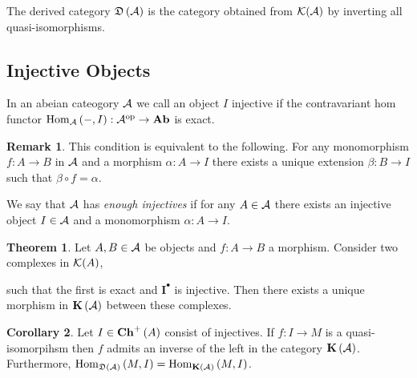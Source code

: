 \documentclass[12pt]{extarticle}
\theoremstyle{definition}
\newtheorem{theorem}{Theorem}[section]
\newtheorem{corollary}[theorem]{Corollary}
\newtheorem{remark}{Remark}
\newenvironment{definition}[1][Definition:]{\begin{trivlist}
\item[\hskip \labelsep {\bfseries #1}]}{\end{trivlist}}
\renewcommand{\bf}[1]{\mathbf{#1}}
\begin{document}
\begin{definition}
The derived category $\mathfrak{D}\left( \mathcal{A} \right)$ is the category obtained from $\mathcal{K}(\mathcal{A})$ by inverting all quasi-isomorphisms. 
\end{definition}

\subsection{Injective Objects}

\begin{definition}
In an abeian cateogory $\mathcal{A}$ we call an object $I$ injective if the contravariant hom functor $\mathrm{Hom}_{\mathcal{A}}\left( -, I \right) : \mathcal{A}^{\mathrm{op}} \to \mathbf{Ab}$ is exact. 
\end{definition}

\begin{remark}
This condition is equivalent to the following. For any monomorphism $f : A \to B$ in $\mathcal{A}$ and a morphism $\alpha : A \to I$ there exists a unique extension $\beta : B \to I$ such that $\beta \circ f = \alpha$. 
\begin{center}
\end{center}
\end{remark}

\begin{definition}
We say that $\mathcal{A}$ has \textit{enough injectives} if for any $A \in \mathcal{A}$ there exists an injective object $I \in \mathcal{A}$ and a monomorphism $\alpha : A \to I$. 
\end{definition}

\begin{theorem}
Let $A, B \in \mathcal{A}$ be objects and $f : A \to B$ a morphism. Consider two complexes in $\mathcal{K}(A)$,
\begin{center}
\end{center}
such that the first is exact and $\bf{I}^\bullet$ is injective. Then there exists a unique morphism in $\mathbf{K}\left( \mathcal{A} \right)$ between these complexes.
\end{theorem}

\begin{corollary}
Let $I \in \mathbf{Ch}^+\left( A \right)$ consist of injectives. If $f : I \to M$ is a quasi-isomorpihsm then $f$ admits an inverse of the left in the category $\mathbf{K}\left( \mathcal{A} \right)$. Furthermore, $\mathrm{Hom}_{\mathfrak{D}\left( \mathcal{A} \right)}\left( M, I \right) = \mathrm{Hom}_{\mathbf{K}\left( \mathcal{A} \right)}\left( M, I \right)$.
\end{corollary}
\end{document}
